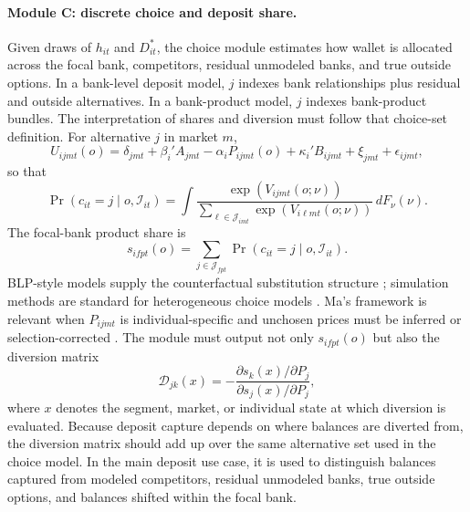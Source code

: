 \documentclass[11pt]{article}
\begin{document}
\paragraph{Module C: discrete choice and deposit share.}
Given draws of $h_{it}$ and $D_{it}^{*}$, the choice module estimates how wallet
is allocated across the focal bank, competitors, residual unmodeled banks, and
true outside options. In a bank-level deposit model, $j$ indexes bank
relationships plus residual and outside alternatives. In a bank-product model,
$j$ indexes bank-product bundles. The interpretation of shares and diversion
must follow that choice-set definition. For alternative $j$ in market $m$,
\[
  U_{ijmt}(o)
  =
  \delta_{jmt}
  +\beta_i'A_{jmt}
  -\alpha_iP_{ijmt}(o)
  +\kappa_i'B_{ijmt}
  +\xi_{jmt}
  +\epsilon_{ijmt},
\]
so that
\[
  \Pr(c_{it}=j\mid o,\mathcal{I}_{it})
  =
  \int
  \frac{\exp(V_{ijmt}(o;\nu))}
       {\sum_{\ell\in\mathcal{J}_{imt}}\exp(V_{i\ell mt}(o;\nu))}
  \,dF_{\nu}(\nu).
\]
The focal-bank product share is
\[
  s_{ifpt}(o)
  =
  \sum_{j\in\mathcal{J}_{fpt}}
  \Pr(c_{it}=j\mid o,\mathcal{I}_{it}).
\]
BLP-style models supply the counterfactual substitution structure
\citep{berry1995automobile}; simulation methods are standard for heterogeneous
choice models \citep{train2009discrete}. Ma's framework is relevant when
$P_{ijmt}$ is individual-specific and unchosen prices must be inferred or
selection-corrected \citep{ma2024discrete}. The module must output not only
$s_{ifpt}(o)$ but also the diversion matrix
\[
  \mathcal{D}_{jk}(x)
  =
  -\frac{\partial s_k(x)/\partial P_j}
        {\partial s_j(x)/\partial P_j},
\]
where $x$ denotes the segment, market, or individual state at which diversion is
evaluated. Because deposit capture depends on where balances are diverted from,
the diversion matrix should add up over the same alternative set used in the
choice model. In the main deposit use case, it is used to distinguish balances
captured from modeled competitors, residual unmodeled banks, true outside
options, and balances shifted within the focal bank.
\end{document}
